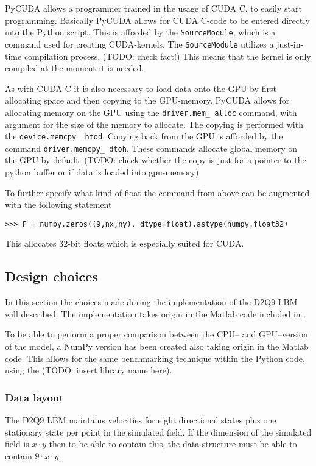 PyCUDA allows a programmer trained in the usage of CUDA C, to easily start programming. Basically PyCUDA allows for CUDA C-code to be entered directly into the Python script. This is afforded by the \texttt{SourceModule}, which is a command used for creating CUDA-kernels. The \texttt{SourceModule} utilizes a just-in-time compilation process. (TODO: check fact!) This means that the kernel is only compiled at the moment it is needed.

As with CUDA C it is also necessary to load data onto the GPU by first allocating space and then copying to the GPU-memory. PyCUDA allows for allocating memory on the GPU using the \texttt{driver.mem\_ alloc} command, with argument for the size of the memory to allocate. The copying is performed with the \texttt{device.memcpy\_ htod}. Copying back from the GPU is afforded by the command \texttt{driver.memcpy\_ dtoh}. These commands allocate global memory on the GPU by default. (TODO: check whether the copy is just for a pointer to the python buffer or if data is loaded into gpu-memory)

To further specify what kind of float the command from above can be augmented with the following statement

\begin{verbatim}
>>> F = numpy.zeros((9,nx,ny), dtype=float).astype(numpy.float32)
\end{verbatim}

This allocates 32-bit floats which is especially suited for CUDA.


\newpage
\subsection{Design choices}
In this section the choices made during the implementation of the D2Q9 LBM will described. The implementation takes origin in the Matlab code included in .

To be able to perform a proper comparison between the CPU-- and GPU--version of the model, a NumPy version has been created also taking origin in the Matlab code. This allows for the same benchmarking technique within the Python code, using the (TODO: insert library name here).

\subsubsection{Data layout}
The D2Q9 LBM maintains velocities for eight directional states plus one stationary state per point in the simulated field. If the dimension of the simulated field is $x \cdot y$ then to be able to contain this, the data structure must be able to contain $9 \cdot x \cdot y$.

